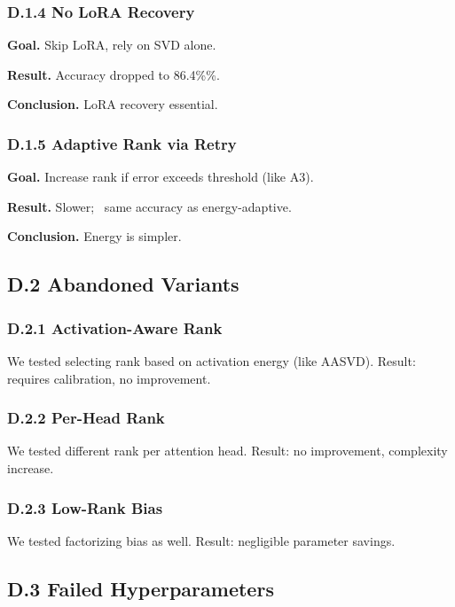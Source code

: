 \subsubsection{D.1.4 No LoRA Recovery}

\textbf{Goal.} Skip LoRA, rely on SVD alone.

\textbf{Result.} Accuracy dropped to 86.4\%\%.

\textbf{Conclusion.} LoRA recovery essential.

\subsubsection{D.1.5 Adaptive Rank via Retry}

\textbf{Goal.} Increase rank if error exceeds threshold (like A3).

\textbf{Result.} Slower; ~same accuracy as energy-adaptive.

\textbf{Conclusion.} Energy is simpler.

\subsection{D.2 Abandoned Variants}

\subsubsection{D.2.1 Activation-Aware Rank}

We tested selecting rank based on activation energy (like AASVD). Result: 
requires calibration, no improvement.

\subsubsection{D.2.2 Per-Head Rank}

We tested different rank per attention head. Result: no improvement, 
complexity increase.

\subsubsection{D.2.3 Low-Rank Bias}

We tested factorizing bias as well. Result: negligible parameter savings.

\subsection{D.3 Failed Hyperparameters}

